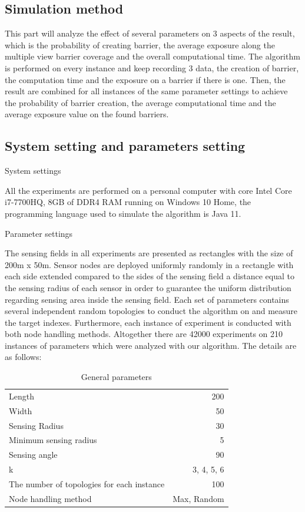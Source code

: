 
\subsection{Simulation method}

This part will analyze the effect of several parameters on 3 aspects of the result, which is the probability of creating barrier, the average exposure along the multiple view barrier coverage and the overall computational time. The algorithm is performed on every instance and keep recording 3 data, the creation of barrier, the computation time and the exposure on a barrier if there is one. Then, the result are combined for all instances of the same parameter settings to achieve the probability of barrier creation, the average computational time and the average exposure value on the found barriers.

\subsection{System setting and parameters setting}
System settings

All the experiments are performed on a personal computer with core Intel Core i7-7700HQ, 8GB of DDR4 RAM running on Windows 10 Home, the programming language used to simulate the algorithm is Java 11.

Parameter settings

The sensing fields in all experiments are presented as rectangles with the size of 200m x 50m. Sensor nodes are deployed uniformly randomly in a rectangle with each side extended compared to the sides of the sensing field a distance equal to the sensing radius of each sensor in order to guarantee the uniform distribution regarding sensing area inside the sensing field. Each set of parameters contains several independent random topologies to conduct the algorithm on and measure the target indexes. Furthermore, each instance of experiment is conducted with both node handling methods. Altogether there are 42000 experiments on 210 instances of parameters which were analyzed with our algorithm. The details are as follows:
\begin{table}[h!]
	\centering
	\begin{tabular}{l | r}
		Length & 200 \\
		Width & 50 \\
		Sensing Radius & 30 \\
		Minimum sensing radius & 5 \\
		Sensing angle & 90 \\
		k & 3, 4, 5, 6 \\
		The number of topologies for each instance & 100 \\
		Node handling method & Max, Random
		
	\end{tabular}
	\caption{General parameters}
\end{table}

